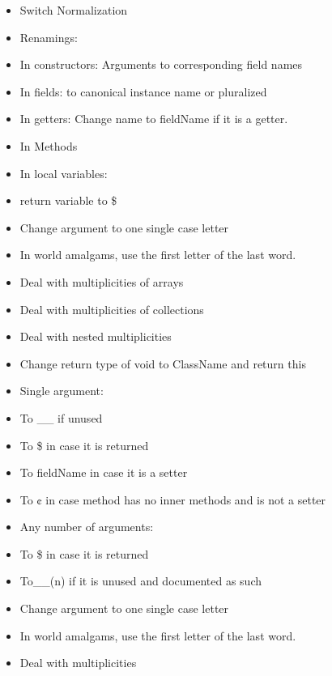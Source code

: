 \begin{itemize}
\item Switch Normalization
\item Renamings:
\item In constructors: Arguments to corresponding field names
\item In fields: to canonical instance name or pluralized
\item In getters: Change name to fieldName if it is a getter.
\item In Methods
\item In local variables:
\item return variable to \$
\item Change argument to one single case letter
\item In world amalgams, use the first letter of the last word.
\item Deal with multiplicities of arrays
\item Deal with multiplicities of collections
\item Deal with nested multiplicities
\item Change return type of void to ClassName and return this
\item Single argument:
\item To \_\_ if unused
\item To \$ in case it is returned
\item To fieldName in case it is a setter
\item To ¢ in case method has no inner methods and is not a setter
\item Any number of arguments:
\item To \$ in case it is returned
\item To__(n) if it is unused and documented as such
\item Change argument to one single case letter
\item In world amalgams, use the first letter of the last word.
\item Deal with multiplicities
\end{itemize}

